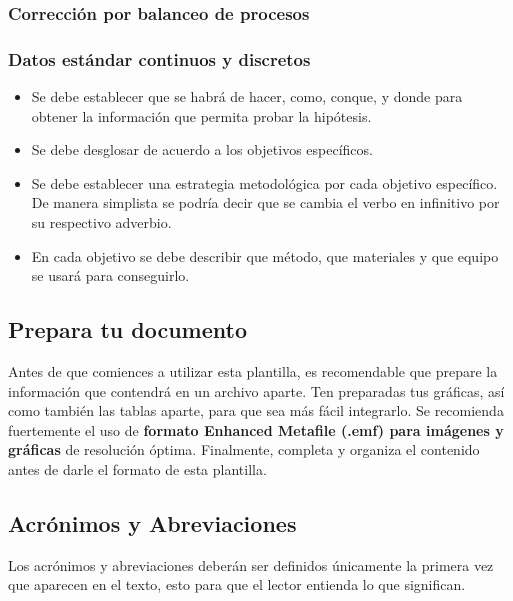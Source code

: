     \subsubsection{Corrección por balanceo de procesos}
    
    \subsubsection{Datos estándar continuos y discretos}
    
    \begin{itemize}
        \item Se debe establecer que se habrá de hacer, como, conque, y donde para obtener la información que permita probar la hipótesis.  
        \item Se debe desglosar de acuerdo a los objetivos específicos. 
        \item Se debe establecer una estrategia metodológica por cada objetivo específico. De manera simplista se podría decir que se cambia el verbo en infinitivo por su respectivo adverbio.
        \item En cada objetivo se debe describir que método, que materiales y que equipo se usará para conseguirlo.
    \end{itemize}
    
    \subsection{Prepara tu documento}
    
    Antes de que comiences a utilizar esta plantilla, es recomendable que prepare la información que contendrá en un archivo aparte. 
    Ten preparadas tus gráficas, así como también las tablas aparte, para que sea más fácil integrarlo. 
    Se recomienda fuertemente el uso de \textbf{formato Enhanced Metafile (.emf) para imágenes y gráficas} de resolución óptima. 
    Finalmente, completa y organiza el contenido antes de darle el formato de esta plantilla. 
    
    \subsection{Acrónimos y Abreviaciones}
    
    Los acrónimos y abreviaciones deberán ser definidos únicamente la primera vez que aparecen en el texto, esto para que el lector entienda lo que significan.
    
